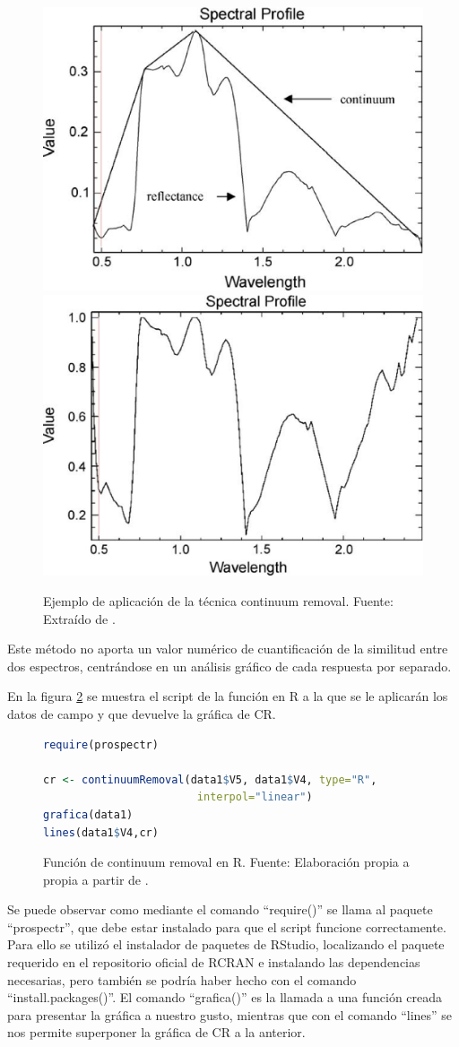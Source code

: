 \begin{figure}
	\centering
	\includegraphics[width=0.5\linewidth]{./Imagenes/CR1.eps}
	\includegraphics[width=0.5\linewidth]{./Imagenes/CR2.eps}
	\caption[Continuum Removal ejemplo]{Ejemplo de aplicación de la técnica continuum removal. Fuente: Extraído de \cite{huang2004estimating}.}
	\label{fig:ejemploCR}
\end{figure}

Este método no aporta un valor numérico de cuantificación de la similitud entre dos espectros, centrándose en un análisis gráfico de cada respuesta por separado.\Sep

En la figura \ref{fig:CR} se muestra el script de la función en R a la que se le aplicarán los datos de campo y que devuelve la gráfica de \ac{CR}.

\begin{figure}
\centering
\begin{lstlisting}[language = R, frame = single]
require(prospectr)

cr <- continuumRemoval(data1$V5, data1$V4, type="R",
						interpol="linear")
grafica(data1)
lines(data1$V4,cr)
\end{lstlisting}
\caption[Función continuum removal]{Función de continuum removal en R. Fuente: Elaboración propia a propia a partir de \cite{stevens2014introduction}.}
\label{fig:CR}
\end{figure}

Se puede observar como mediante el comando ``require()'' se llama al paquete ``prospectr'', que debe estar instalado para que el script funcione correctamente. Para ello se utilizó el instalador de paquetes de RStudio, localizando el paquete requerido en el repositorio oficial de RCRAN e instalando las dependencias necesarias, pero también se podría haber hecho con el comando ``install.packages()''. El comando ``grafica()'' es la llamada a una función creada para presentar la gráfica a nuestro gusto, mientras que con el comando ``lines'' se nos permite superponer la gráfica de \ac{CR} a la anterior.

